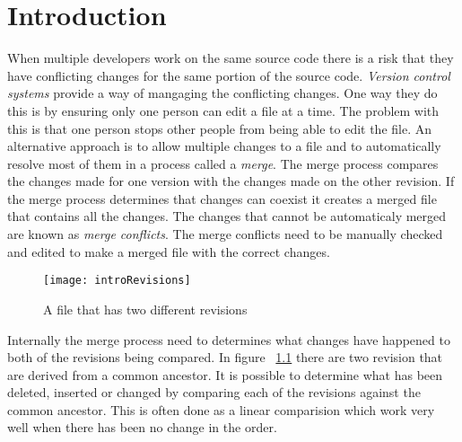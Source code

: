 
\chapter{Introduction}\label{C:intro}

When multiple developers work on the same source code there is a risk that they have conflicting changes for the same portion of the source code. \emph{Version control systems} provide a way of mangaging the conflicting changes. One way they do this is by ensuring only one person can edit a file at a time. The problem with this is that one person stops other people from being able to edit the file. An alternative approach is to allow multiple changes to a file and to automatically resolve most of them in a process called a \emph{merge}.  The merge process compares the changes made for one version with the changes made on the other revision. If the merge process determines that changes can coexist it creates a merged file that contains all the changes. The changes that cannot be automaticaly merged are known as \emph{merge conflicts}.  The merge conflicts need to be manually checked and edited to make a merged file with the correct changes.

\begin{figure}[h]
 \begin{center}
 \texttt{[image: introRevisions]}
 \end{center}
 \caption{A file that has two different revisions}
 \label{fig:introRevisions}
\end{figure}


Internally the merge process need to determines what changes have happened to both of the revisions being compared.   In figure  ~\ref{fig:introRevisions} there are two revision that are derived from a common ancestor. It is possible to determine what has been deleted, inserted or changed by comparing each of the revisions against the common ancestor.  This is often done as a linear comparision which work very well when there has been no change in the order.

